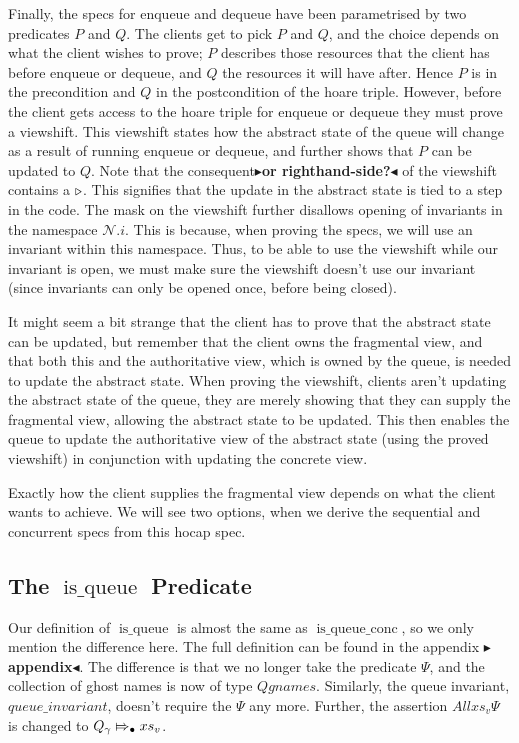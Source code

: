 \documentclass[twoside,11pt,openright]{report}
\newcommand{\isqueue}{\operatorname{is\_queue}}
\newcommand{\isqueueconc}{\operatorname{is\_queue\_conc}}
\newcommand{\Qg}{Q_\gname}
\newcommand{\Nl}{\ensuremath{\mathcal{N}}}
\newcommand{\abstractstateauth}[2]{#1 \Mapsto_{\bullet} #2}
\newcommand{\todo}[1]{{\color[rgb]{.5,0,0}\textbf{$\blacktriangleright$#1$\blacktriangleleft$}}}
\begin{document}
Finally, the specs for enqueue and dequeue have been parametrised by two predicates $P$ and $Q$. The clients get to pick $P$ and $Q$, and the choice depends on what the client wishes to prove; $P$ describes those resources that the client has before enqueue or dequeue, and $Q$ the resources it will have after. Hence $P$ is in the precondition and $Q$ in the postcondition of the hoare triple. However, before the client gets access to the hoare triple for enqueue or dequeue they must prove a viewshift. This viewshift states how the abstract state of the queue will change as a result of running enqueue or dequeue, and further shows that $P$ can be updated to $Q$. Note that the consequent\todo{or righthand-side?} of the viewshift contains a $\mathop{\triangleright}$. This signifies that the update in the abstract state is tied to a step in the code. The mask on the viewshift further disallows opening of invariants in the namespace $\Nl.i$. This is because, when proving the specs, we will use an invariant within this namespace. Thus, to be able to use the viewshift while our invariant is open, we must make sure the viewshift doesn't use our invariant (since invariants can only be opened once, before being closed).

It might seem a bit strange that the client has to prove that the abstract state can be updated, but remember that the client owns the fragmental view, and that both this and the authoritative view, which is owned by the queue, is needed to update the abstract state. When proving the viewshift, clients aren't updating the abstract state of the queue, they are merely showing that they can supply the fragmental view, allowing the abstract state to be updated. This then enables the queue to update the authoritative view of the abstract state (using the proved viewshift) in conjunction with updating the concrete view.

Exactly how the client supplies the fragmental view depends on what the client wants to achieve. We will see two options, when we derive the sequential and concurrent specs from this hocap spec.

\subsection[The isqueue predicate]{The $\isqueue$ Predicate}
Our definition of $\isqueue$ is almost the same as $\isqueueconc$, so we only mention the difference here. The full definition can be found in the appendix \todo{appendix}. The difference is that we no longer take the predicate $\Psi$, and the collection of ghost names is now of type $Qgnames$. Similarly, the queue invariant, $queue\_invariant$, doesn't require the $\Psi$ any more. Further, the assertion $All xs_v \Psi$ is changed to $\abstractstateauth{\Qg}{xs_v}$.
\end{document}
